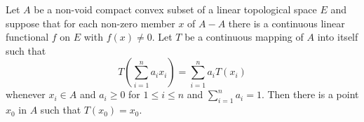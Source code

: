 Let $A$ be a non-void compact convex subset of a linear topological space $E$ and suppose that for each non-zero member $x$ of $A - A$ there is a continuous linear functional $f$ on $E$ with $f(x) \neq 0$. Let $T$ be a continuous mapping of $A$ into itself such that
$$T\left(\sum_{i=1}^{n} a_i x_i\right) = \sum_{i=1}^{n} a_i T(x_i)$$
whenever $x_i \in A$ and $a_i \geq 0$ for $1 \leq i \leq n$ and $\sum_{i=1}^{n} a_i = 1$. Then there is a point $x_0$ in $A$ such that $T(x_0) = x_0$.

